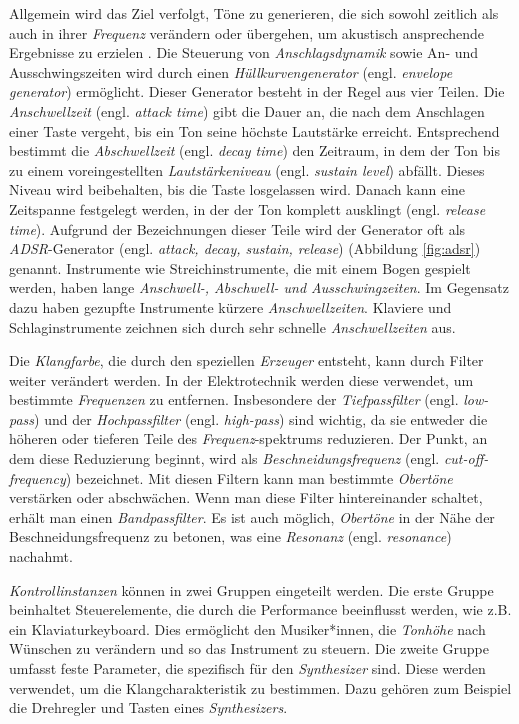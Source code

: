 \documentclass[
  a4paper,  %
  twoside,  %
  bibliography=totoc,
  headsepline,
  cleardoublepage=empty,
  parskip=half,
  draft=false
]{scrbook}
\begin{document}
Allgemein wird das Ziel verfolgt, Töne zu generieren, die sich sowohl zeitlich als auch in ihrer \emph{Frequenz} verändern oder übergehen, um akustisch ansprechende Ergebnisse zu erzielen \cite{pirkle_designing_2021}. Die Steuerung von \emph{Anschlagsdynamik} sowie An- und Ausschwingszeiten wird durch einen \emph{Hüllkurvengenerator} (engl. \emph{envelope generator}) ermöglicht. Dieser Generator besteht in der Regel aus vier Teilen. Die \emph{Anschwellzeit} (engl. \emph{attack time}) gibt die Dauer an, die nach dem Anschlagen einer Taste vergeht, bis ein Ton seine höchste Lautstärke erreicht. Entsprechend bestimmt die \emph{Abschwellzeit} (engl. \emph{decay time}) den Zeitraum, in dem der Ton bis zu einem voreingestellten \emph{Lautstärkeniveau} (engl. \emph{sustain level}) abfällt. Dieses Niveau wird beibehalten, bis die Taste losgelassen wird. Danach kann eine Zeitspanne festgelegt werden, in der der Ton komplett ausklingt (engl. \emph{release time}). Aufgrund der Bezeichnungen dieser Teile wird der Generator oft als \emph{ADSR}-Generator (engl. \emph{attack, decay, sustain, release}) (Abbildung \ref{fig:adsr}) genannt. Instrumente wie Streichinstrumente, die mit einem Bogen gespielt werden, haben lange \emph{Anschwell-, Abschwell- und Ausschwingzeiten}. Im Gegensatz dazu haben gezupfte Instrumente kürzere \emph{Anschwellzeiten}. Klaviere und Schlaginstrumente zeichnen sich durch sehr schnelle \emph{Anschwellzeiten} aus. \cite{ruschkowski_elektronische_2019, russ_sound_2009}

Die \emph{Klangfarbe}, die durch den speziellen \emph{Erzeuger} entsteht, kann durch Filter weiter verändert werden. In der Elektrotechnik werden diese verwendet, um bestimmte \emph{Frequenzen} zu entfernen. Insbesondere der \emph{Tiefpassfilter} (engl. \emph{low-pass}) und der \emph{Hochpassfilter} (engl. \emph{high-pass}) sind wichtig, da sie entweder die höheren oder tieferen Teile des \emph{Frequenz}-spektrums reduzieren. Der Punkt, an dem diese Reduzierung beginnt, wird als \emph{Beschneidungsfrequenz} (engl. \emph{cut-off-frequency}) bezeichnet. Mit diesen Filtern kann man bestimmte \emph{Obertöne} verstärken oder abschwächen. Wenn man diese Filter hintereinander schaltet, erhält man einen \emph{Bandpassfilter}. Es ist auch möglich, \emph{Obertöne} in der Nähe der Beschneidungsfrequenz zu betonen, was eine \emph{Resonanz} (engl. \emph{resonance}) nachahmt. \cite{ruschkowski_elektronische_2019}

\emph{Kontrollinstanzen} können in zwei Gruppen eingeteilt werden. Die erste Gruppe beinhaltet Steuerelemente, die durch die Performance beeinflusst werden, wie z.B. ein Klaviaturkeyboard. Dies ermöglicht den Musiker*innen, die \emph{Tonhöhe} nach Wünschen zu verändern und so das Instrument zu steuern. Die zweite Gruppe umfasst feste Parameter, die spezifisch für den \emph{Synthesizer} sind. Diese werden verwendet, um die Klangcharakteristik zu bestimmen. Dazu gehören zum Beispiel die Drehregler und Tasten eines \emph{Synthesizers}. \cite{russ_sound_2009}
\end{document}
